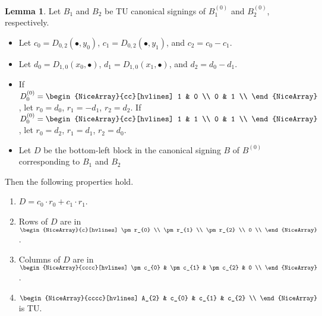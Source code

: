 \documentclass{article}
\theoremstyle{definition}
\newtheorem{lemma}[theorem]{Lemma}
\begin{document}
\begin{lemma}\label{lem:three_sum_canonical_signing_properties}
    Let $B_{1}$ and $B_{2}$ be TU canonical signings of $B_{1}^{(0)}$ and $B_{2}^{(0)}$, respectively.
    \begin{itemize}
        \item Let $c_{0} = D_{0, 2} (\bullet, y_{0})$, $c_{1} = D_{0, 2} (\bullet, y_{1})$, and $c_{2} = c_{0} - c_{1}$.
        \item Let $d_{0} = D_{1, 0} (x_{0}, \bullet)$, $d_{1} = D_{1, 0} (x_{1}, \bullet)$, and $d_{2} = d_{0} - d_{1}$.
        \item If $D_{0}^{(0)} = \begin{NiceArray}{cc}[hvlines] 1 & 0 \\ 0 & 1 \\ \end{NiceArray}$, let $r_{0} = d_{0}$, $r_{1} = -d_{1}$, $r_{2} = d_{2}$. If $D_{0}^{(0)} = \begin{NiceArray}{cc}[hvlines] 1 & 1 \\ 0 & 1 \\ \end{NiceArray}$, let $r_{0} = d_{2}$, $r_{1} = d_{1}$, $r_{2} = d_{0}$.
        \item Let $D$ be the bottom-left block in the canonical signing $B$ of $B^{(0)}$ corresponding to $B_{1}$ and $B_{2}$
    \end{itemize}
    Then the following properties hold.
    \begin{enumerate}
        \item\label{item:three_sum_canonical_signing_D_eq} $D = c_{0} \cdot r_{0} + c_{1} \cdot r_{1}$.
        \item\label{item:three_sum_canonical_signing_D_rows} Rows of $D$ are in $\begin{NiceArray}{c}[hvlines] \pm r_{0} \\ \pm r_{1} \\ \pm r_{2} \\ 0 \\ \end{NiceArray}$.
        \item\label{item:three_sum_canonical_signing_D_cols} Columns of $D$ are in $\begin{NiceArray}{cccc}[hvlines] \pm c_{0} & \pm c_{1} & \pm c_{2} & 0 \\ \end{NiceArray}$.
        \item\label{item:three_sum_canonical_signing_TU_A_2_cs} $\begin{NiceArray}{cccc}[hvlines] A_{2} & c_{0} & c_{1} & c_{2} \\ \end{NiceArray}$ is TU.

\end{enumerate}
\end{lemma}
\end{document}
